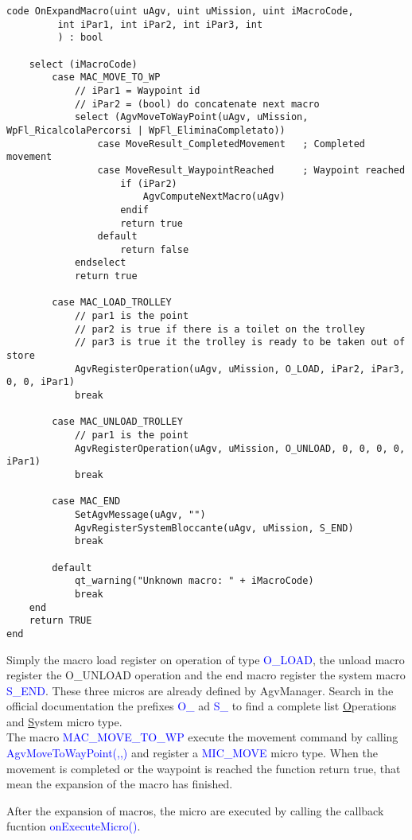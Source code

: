 \begin{lstlisting}[caption=onExpandMacro(), label=lstonExpandMacro]
code OnExpandMacro(uint uAgv, uint uMission, uint iMacroCode,
		 int iPar1, int iPar2, int iPar3, int
		 ) : bool
		 
	select (iMacroCode)
		case MAC_MOVE_TO_WP
			// iPar1 = Waypoint id
			// iPar2 = (bool) do concatenate next macro
			select (AgvMoveToWayPoint(uAgv, uMission, WpFl_RicalcolaPercorsi | WpFl_EliminaCompletato))
				case MoveResult_CompletedMovement	; Completed movement
				case MoveResult_WaypointReached		; Waypoint reached
					if (iPar2)
						AgvComputeNextMacro(uAgv)
					endif
					return true
				default
					return false
			endselect
			return true
		
		case MAC_LOAD_TROLLEY
			// par1 is the point
			// par2 is true if there is a toilet on the trolley
			// par3 is true it the trolley is ready to be taken out of store
			AgvRegisterOperation(uAgv, uMission, O_LOAD, iPar2, iPar3, 0, 0, iPar1)
			break
		
		case MAC_UNLOAD_TROLLEY
			// par1 is the point
			AgvRegisterOperation(uAgv, uMission, O_UNLOAD, 0, 0, 0, 0, iPar1)
			break
		
		case MAC_END
			SetAgvMessage(uAgv, "")
			AgvRegisterSystemBloccante(uAgv, uMission, S_END)
			break
		
		default
			qt_warning("Unknown macro: " + iMacroCode)
			break
	end
	return TRUE
end
\end{lstlisting}

Simply the macro load register on operation of type \textcolor{blue}{O\_LOAD}, the unload macro register the {O\_UNLOAD} operation and the end macro register the system macro \textcolor{blue}{S\_END}. These three micros are already defined by AgvManager.
Search in the official documentation the prefixes \textcolor{blue}{O\_} ad \textcolor{blue}{S\_} to find a complete list \underline{O}perations  and \underline{S}ystem micro type.\\

The macro \textcolor{blue}{MAC\_MOVE\_TO\_WP} execute the movement command by calling \textcolor{blue}{AgvMoveToWayPoint(,,)} and register a \textcolor{blue}{MIC\_MOVE} micro type. When the movement is completed or the waypoint is reached the function return true, that mean the expansion of the macro has finished.

After the expansion of macros, the micro are executed by calling the callback fucntion \textcolor{blue}{onExecuteMicro()}.

